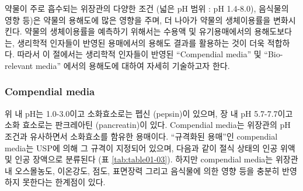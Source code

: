 \documentclass[
  11pt,
  krantz2, a4paper, twoside]{krantz}
\begin{document}
약물이 주로 흡수되는 위장관의 다양한 조건 (넓은 pH 범위 : pH 1.4-8.0), 음식물의 영향 등)은 약물의 용해도에 많은 영향을 주며, 더 나아가 약물의 생체이용률을 변화시킨다.
약물의 생체이용률을 예측하기 위해서는 수용액 및 유기용매에서의 용해도보다는, 생리학적 인자들이 반영된 용매에서의 용해도 결과를 활용하는 것이 더욱 적합하다. 따라서 이 절에서는 생리학적 인자들이 반영된 ``Compendial media'' 및 ``Bio-relevant media'' 에서의 용해도에 대하여 자세히 기술하고자 한다.

\hypertarget{compendial-media}{%
\subsubsection{Compendial media}\label{compendial-media}}

위 내 pH는 1.0-3.0이고 소화효소로는 펩신 (pepsin)이 있으며, 장 내 pH 5.7-7.7이고 소화 효소로는 판크레아틴 (pancreatin)이 있다. Compendial media는 위장관의 pH 조건과 유사하면서 소화효소를 함유한 용매이다.
``규격화된 용매''인 compendial media는 USP에 의해 그 규격이 지정되어
있으며, 다음과 같이 절식 상태의 인공 위액 및 인공 장액으로 분류된다 (표 \ref{tab:table01-03}).
하지만 compendial media는 위장관 내 오스몰농도, 이온강도, 점도, 표면장력 그리고 음식물에 의한 영향 등을 충분히 반영하지 못한다는 한계점이 있다.
\end{document}
